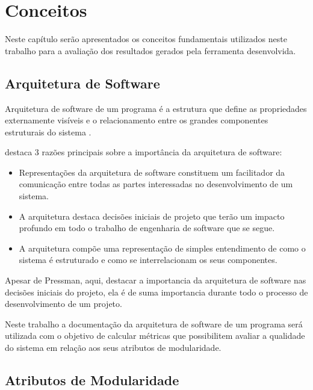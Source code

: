 \chapter{Conceitos} \label{ch:conceitos}

Neste capítulo serão apresentados os conceitos fundamentais utilizados neste
trabalho para a avaliação dos resultados gerados pela ferramenta desenvolvida.

\section{Arquitetura de Software}

Arquitetura de software de um programa é a estrutura que define as propriedades
externamente visíveis e o relacionamento entre os grandes componentes
estruturais do sistema \cite{engenhariaDeSoftwarePressman}.

 destaca 3 razões principais sobre a
importância da arquitetura de software:

\begin{itemize}

\item Representações da arquitetura de software constituem um facilitador da
comunicação entre todas as partes interessadas no desenvolvimento de um
sistema.

\item A arquitetura destaca decisões iniciais de projeto que terão um impacto
profundo em todo o trabalho de engenharia de software que se segue.

\item A arquitetura compõe uma representação de simples entendimento de como o
sistema é estruturado e como se interrelacionam os seus componentes.

\end{itemize}

Apesar de Pressman, aqui, destacar a importancia da arquitetura de software nas
decisões iniciais do projeto, ela é de suma importancia durante todo o processo
de desenvolvimento de um projeto.

Neste trabalho a documentação da arquitetura de software de um programa será
utilizada com o objetivo de calcular métricas que possibilitem avaliar a
qualidade do sistema em relação aos seus atributos de modularidade.

\section{Atributos de Modularidade}

